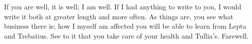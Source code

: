 

If you are well, it is well; I am well. If I had anything to write to you, I would write it both at greater length and more often. As things are, you see what business there is; how I myself am affected you will be able to learn from Lepta and Trebatius. See to it that you take care of your health and Tullia's. Farewell.
